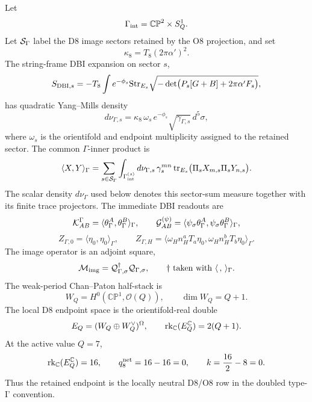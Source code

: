 \documentclass[11pt]{article}
\theoremstyle{definition}
\theoremstyle{remark}
\newcommand{\CP}{\mathbb{CP}}
\begin{document}
Let
\[
  \Gamma_{\rm int}=\CP^2\times S^1_Q .
\]
Let \({\cal S}_\Gamma\) label the D8 image sectors retained by the O8
projection, and set
\[
  \kappa_8=T_8(2\pi\alpha')^2 .
\]
The string-frame DBI expansion on sector \(s\),
\[
  S_{{\rm DBI},s}
  =
  -T_8\int e^{-\phi_s}
  {\rm Str}_{E_s}
  \sqrt{-\det\bigl(P_s[G+B]+2\pi\alpha'F_s\bigr)},
\]
has quadratic Yang--Mills density
\[
  d\nu_{\Gamma,s}
  =
  \kappa_8\,\omega_s\,e^{-\phi_s}
  \sqrt{\gamma_{\Gamma,s}}\,
  d^5\sigma ,
\]
where \(\omega_s\) is the orientifold and endpoint multiplicity assigned to
the retained sector.  The common \(\Gamma\)-inner product is
\[
  \langle X,Y\rangle_\Gamma
  =
  \sum_{s\in{\cal S}_\Gamma}
  \int_{\Gamma_{\rm int}^{(s)}}d\nu_{\Gamma,s}\,
  \gamma_s^{mn}\,
  {\rm tr}_{E_s}
  \bigl(\Pi_sX_{m,s}\Pi_sY_{n,s}\bigr).
\]
The scalar density \(d\nu_\Gamma\) used below denotes this sector-sum measure
together with its finite trace projectors.  The immediate DBI readouts are
\[
  {\cal K}_{AB}^\Gamma
  =
  \langle\theta_\Gamma^A,\theta_\Gamma^B\rangle_\Gamma,
  \qquad
  {\cal G}_{AB}^{(\psi)}
  =
  \langle\psi_\sigma\theta_\Gamma^A,
  \psi_\sigma\theta_\Gamma^B\rangle_\Gamma,
\]
\[
  Z_{\Gamma,0}=\langle\eta_0,\eta_0\rangle_\Gamma,
  \qquad
  Z_{\Gamma,H}
  =
  \langle\omega_H n_H^aT_a\eta_0,
  \omega_H n_H^bT_b\eta_0\rangle_\Gamma .
\]
The image operator is an adjoint square,
\[
  {\cal M}_{\rm img}={\cal Q}_{\Gamma,\sigma}^\dagger
  {\cal Q}_{\Gamma,\sigma},
  \qquad
  \dagger \text{ taken with } \langle\,,\,\rangle_\Gamma .
\]
The weak-period Chan--Paton half-stack is
\[
  W_Q=H^0(\CP^1,\mathcal O(Q)),
  \qquad
  \dim W_Q=Q+1 .
\]
The local D8 endpoint space is the orientifold-real double
\[
  E_Q=(W_Q\oplus W_Q^\vee)^\Omega,
  \qquad
  {\rm rk}_{\mathbb C}(E_Q^{\mathbb C})=2(Q+1).
\]
At the active value \(Q=7\),
\[
  {\rm rk}_{\mathbb C}(E_Q^{\mathbb C})=16,
  \qquad
  q_8^{\rm net}=16-16=0,
  \qquad
  k=\frac{16}{2}-8=0 .
\]
Thus the retained endpoint is the locally neutral D8/O8 row in the doubled
type-I' convention.
\end{document}
